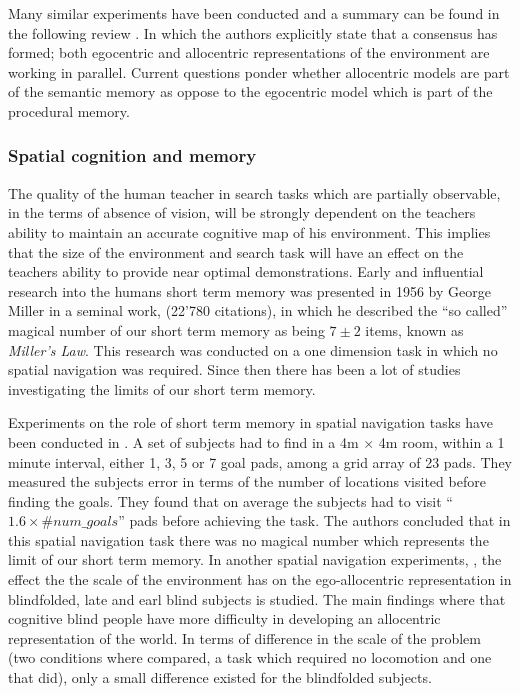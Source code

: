 Many similar experiments have been conducted and a summary can be found in the following review \cite{spatial_memory_how_ego_allo_combine_2006}.
In which the authors explicitly state that a consensus has formed; both egocentric and allocentric representations of the environment are 
working in parallel. Current questions ponder whether allocentric models are part of the semantic memory as oppose to the egocentric model 
which is part of the procedural memory.

\subsubsection{Spatial cognition and memory}

The quality of the human teacher in  search tasks which are partially observable, in the terms of absence of vision,
will be strongly dependent on the teachers ability to maintain an accurate cognitive map of his environment. This implies
that the size of the environment and search task will have an effect on the teachers ability to provide near optimal 
demonstrations. 
Early and influential research into the humans short term memory was presented in 1956 by George Miller in a seminal work, \cite{cogprints730} 
(22'780 citations), in which he described the ``so called'' magical number of our short term memory as being $7\pm2$ items, 
known as \textit{Miller's Law}. This research was conducted on a one dimension task in which no spatial navigation was required.
Since then there has been a lot of studies investigating the limits of our short term memory.

Experiments on the role of short term memory in spatial navigation tasks have been conducted in \cite{human_stsm_2015}. 
A set of subjects had to find in a 4m $\times$ 4m room, within a 1 minute interval, either 1, 3, 5 or 7 goal pads, among a grid array of 23 pads. They measured the subjects error
in terms of the number of locations visited before finding the goals. They found that on average the subjects
had to visit ``$1.6 \times \#num\_goals$'' pads before achieving the task. The authors concluded that in 
this spatial navigation task there was no magical number which represents the limit of our short term memory.
In another spatial navigation experiments, \cite{Iachini2014}, the effect the the scale of the environment 
has on the ego-allocentric representation in blindfolded, late and earl blind subjects is studied. The main findings where
that cognitive blind people have more difficulty in developing an allocentric representation of the world. In terms of 
difference in the scale of the problem (two conditions where compared, a task which required no locomotion and one that did), 
only a small difference existed for the blindfolded subjects.

